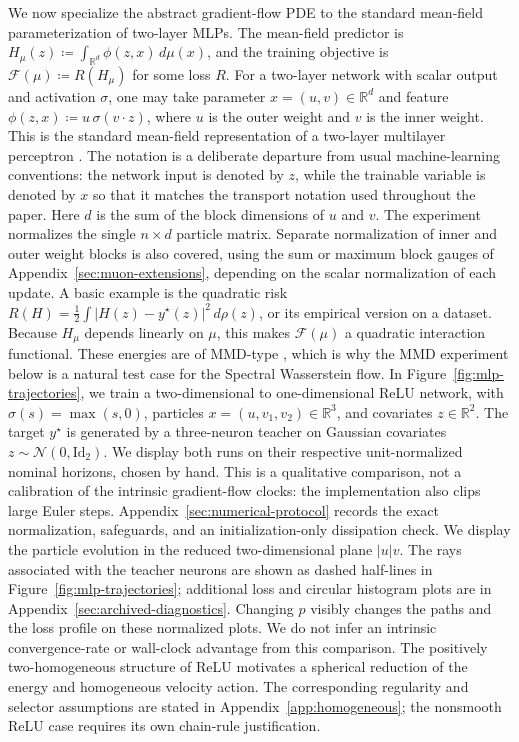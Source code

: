 \documentclass{article}
\newcommand{\R}{\mathbb{R}}
\newcommand{\MF}{\mathcal{F}}
\newcommand{\Id}{\mathrm{Id}}
\newcommand{\abs}[1]{\left\lvert #1 \right\rvert}
\begin{document}
We now specialize the abstract gradient-flow PDE to the standard mean-field parameterization of two-layer MLPs.
The mean-field predictor is
$H_\mu(z)\coloneqq\int_{\R^d}\phi(z,x)\,d\mu(x)$, and the training objective
is $\MF(\mu)\coloneqq R(H_\mu)$ for some loss $R$.
For a two-layer network with scalar output and activation $\sigma$, one may take parameter $x=(u,v)\in\R^d$ and feature $\phi(z,x)\coloneqq u\,\sigma(v\cdot z)$, where $u$ is the outer weight and $v$ is the inner weight.
This is the standard mean-field representation of a two-layer multilayer perceptron \citep{MeiMontanariNguyen2018,ChizatBach2018}. 
The notation is a deliberate departure from usual machine-learning conventions: the network input is denoted by $z$, while the trainable variable is denoted by $x$ so that it matches the transport notation used throughout the paper. 
Here $d$ is the sum of the block dimensions of $u$ and $v$. The experiment
normalizes the single $n\times d$ particle matrix. Separate normalization of
inner and outer weight blocks is also covered, using the sum or maximum block
gauges of Appendix~\ref{sec:muon-extensions}, depending on the scalar
normalization of each update. A basic example is the quadratic risk
$R(H)=\frac12\int \abs{H(z)-y^\star(z)}^2\,d\rho(z)$, or its empirical
version on a dataset. Because $H_\mu$ depends linearly on $\mu$, this makes
$\MF(\mu)$ a quadratic interaction functional. These energies are of MMD-type
\citep{GrettonBorgwardtRaschSchoelkopfSmola2012}, which is why the MMD experiment
below is a natural test case for the Spectral Wasserstein flow.
%
In Figure~\ref{fig:mlp-trajectories}, we train a two-dimensional to
one-dimensional ReLU network, with $\sigma(s)=\max(s,0)$, particles
$x=(u,v_1,v_2)\in\R^3$, and covariates $z\in\R^2$. The target
$y^\star$ is generated by a three-neuron teacher on Gaussian covariates
$z\sim\mathcal N(0,\Id_2)$.
%
We display both runs on their respective unit-normalized nominal horizons,
chosen by hand. This is a qualitative comparison, not a calibration of the
intrinsic gradient-flow clocks: the implementation also clips large Euler
steps. Appendix~\ref{sec:numerical-protocol} records the exact normalization,
safeguards, and an initialization-only dissipation check.
%
We display the particle evolution in the reduced two-dimensional plane
$|u|v$. The rays associated with the teacher neurons are shown as dashed
half-lines in Figure~\ref{fig:mlp-trajectories}; additional loss and circular
histogram plots are in Appendix~\ref{sec:archived-diagnostics}.
%
Changing $p$ visibly changes the paths and the loss profile on these
normalized plots. We do not infer an intrinsic convergence-rate or
wall-clock advantage from this comparison.
%
The positively two-homogeneous structure of ReLU motivates a spherical
reduction of the energy and homogeneous velocity action. The corresponding
regularity and selector assumptions are stated in
Appendix~\ref{app:homogeneous}; the nonsmooth ReLU case requires its own
chain-rule justification.
\end{document}
